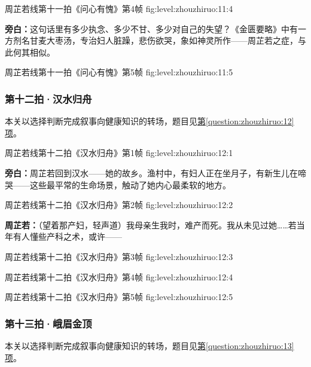   {周芷若线第十一拍《问心有愧》第4帧}
  {fig:level:zhouzhiruo:11:4}
  {\scriptsize}
  {\textbf{旁白：}这句话里有多少执念、多少不甘、多少对自己的失望？《金匮要略》中有一方剂名甘麦大枣汤，专治妇人脏躁，悲伤欲哭，象如神灵所作——周芷若之症，与此何其相似。\par}

\clearpage

  {周芷若线第十一拍《问心有愧》第5帧}
  {fig:level:zhouzhiruo:11:5}
  {\scriptsize}
  {\mbox{}}

\subsubsection{第十二拍·汉水归舟}\label{plot:zhouzhiruo:12}
本关以选择判断完成叙事向健康知识的转场，题目见\hyperref[question:zhouzhiruo:12]{第\ref*{question:zhouzhiruo:12}项}。

  {周芷若线第十二拍《汉水归舟》第1帧}
  {fig:level:zhouzhiruo:12:1}
  {\scriptsize}
  {\textbf{旁白：}周芷若回到汉水——她的故乡。渔村中，有妇人正在坐月子，有新生儿在啼哭——这些最平常的生命场景，触动了她内心最柔软的地方。\par}

  {周芷若线第十二拍《汉水归舟》第2帧}
  {fig:level:zhouzhiruo:12:2}
  {\scriptsize}
  {\textbf{周芷若：}（望着那产妇，轻声道）我母亲生我时，难产而死。我从未见过她……若当年有人懂些产科之术，或许——\par}

\clearpage

  {周芷若线第十二拍《汉水归舟》第3帧}
  {fig:level:zhouzhiruo:12:3}
  {\scriptsize}
  {\mbox{}}

  {周芷若线第十二拍《汉水归舟》第4帧}
  {fig:level:zhouzhiruo:12:4}
  {\scriptsize}
  {\mbox{}}

  {周芷若线第十二拍《汉水归舟》第5帧}
  {fig:level:zhouzhiruo:12:5}
  {\scriptsize}
  {\mbox{}}

\clearpage

\subsubsection{第十三拍·峨眉金顶}\label{plot:zhouzhiruo:13}
本关以选择判断完成叙事向健康知识的转场，题目见\hyperref[question:zhouzhiruo:13]{第\ref*{question:zhouzhiruo:13}项}。

